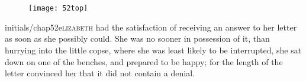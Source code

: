\chapter[Chapter \thechapter]{}
	
	
\begin{figure}[t!]
\centering
\texttt{[image: 52top]}
\end{figure}


\lettrine[lines=6,image=true]{initials/chap52e}{lizabeth}  had the satisfaction of receiving an answer to her letter as soon as she possibly could. She was no sooner in possession of it, than hurrying into the little copse, where she was least likely to be interrupted, she sat down on one of the benches, and prepared to be happy; for the length of the letter convinced her that it did not contain a denial.

